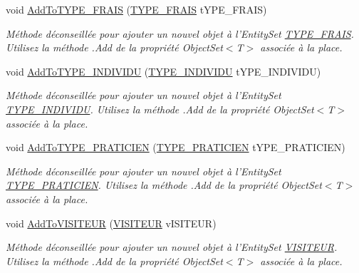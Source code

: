 \begin{DoxyCompactItemize}
void \hyperlink{class_model_1_1_b_d_d___s_i_o7_entities_a432ca0b9d17f17d569c6db05bb44239d}{Add\-To\-T\-Y\-P\-E\-\_\-\-F\-R\-A\-I\-S} (\hyperlink{class_model_1_1_t_y_p_e___f_r_a_i_s}{T\-Y\-P\-E\-\_\-\-F\-R\-A\-I\-S} t\-Y\-P\-E\-\_\-\-F\-R\-A\-I\-S)
\begin{DoxyCompactList}\small\item\em Méthode déconseillée pour ajouter un nouvel objet à l'Entity\-Set \hyperlink{class_model_1_1_t_y_p_e___f_r_a_i_s}{T\-Y\-P\-E\-\_\-\-F\-R\-A\-I\-S}. Utilisez la méthode .Add de la propriété Object\-Set$<$T$>$ associée à la place. \end{DoxyCompactList}\item 
void \hyperlink{class_model_1_1_b_d_d___s_i_o7_entities_a4e51f7a72211f52bb10b28f6aba0dbe1}{Add\-To\-T\-Y\-P\-E\-\_\-\-I\-N\-D\-I\-V\-I\-D\-U} (\hyperlink{class_model_1_1_t_y_p_e___i_n_d_i_v_i_d_u}{T\-Y\-P\-E\-\_\-\-I\-N\-D\-I\-V\-I\-D\-U} t\-Y\-P\-E\-\_\-\-I\-N\-D\-I\-V\-I\-D\-U)
\begin{DoxyCompactList}\small\item\em Méthode déconseillée pour ajouter un nouvel objet à l'Entity\-Set \hyperlink{class_model_1_1_t_y_p_e___i_n_d_i_v_i_d_u}{T\-Y\-P\-E\-\_\-\-I\-N\-D\-I\-V\-I\-D\-U}. Utilisez la méthode .Add de la propriété Object\-Set$<$T$>$ associée à la place. \end{DoxyCompactList}\item 
void \hyperlink{class_model_1_1_b_d_d___s_i_o7_entities_a7f21aafcf6df9a79fcbc6036fda23f8e}{Add\-To\-T\-Y\-P\-E\-\_\-\-P\-R\-A\-T\-I\-C\-I\-E\-N} (\hyperlink{class_model_1_1_t_y_p_e___p_r_a_t_i_c_i_e_n}{T\-Y\-P\-E\-\_\-\-P\-R\-A\-T\-I\-C\-I\-E\-N} t\-Y\-P\-E\-\_\-\-P\-R\-A\-T\-I\-C\-I\-E\-N)
\begin{DoxyCompactList}\small\item\em Méthode déconseillée pour ajouter un nouvel objet à l'Entity\-Set \hyperlink{class_model_1_1_t_y_p_e___p_r_a_t_i_c_i_e_n}{T\-Y\-P\-E\-\_\-\-P\-R\-A\-T\-I\-C\-I\-E\-N}. Utilisez la méthode .Add de la propriété Object\-Set$<$T$>$ associée à la place. \end{DoxyCompactList}\item 
void \hyperlink{class_model_1_1_b_d_d___s_i_o7_entities_a62c2e84fc50405caf6ad75ed7e4cc318}{Add\-To\-V\-I\-S\-I\-T\-E\-U\-R} (\hyperlink{class_model_1_1_v_i_s_i_t_e_u_r}{V\-I\-S\-I\-T\-E\-U\-R} v\-I\-S\-I\-T\-E\-U\-R)
\begin{DoxyCompactList}\small\item\em Méthode déconseillée pour ajouter un nouvel objet à l'Entity\-Set \hyperlink{class_model_1_1_v_i_s_i_t_e_u_r}{V\-I\-S\-I\-T\-E\-U\-R}. Utilisez la méthode .Add de la propriété Object\-Set$<$T$>$ associée à la place. \end{DoxyCompactList}\item 

\end{DoxyCompactItemize}
